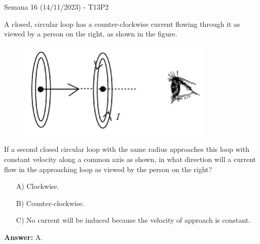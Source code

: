 \begin{frame}{Semana 16 (14/11/2023) - T13P2}
    
    A closed, circular loop has a counter-clockwise current flowing through it as viewed by a person on the right, as shown in the figure.
    
    \begin{figure}
        \centering
        \includegraphics[scale=0.4]{figures/t11p2.png}
    \end{figure}
    
    If a second closed circular loop with the same radius approaches this loop with constant velocity along a common axis as shown, in what direction will a current flow in the approaching loop as viewed by the person on the right?
    
    \begin{itemize}
        \item[A)] Clockwise.
        \item[B)] Counter-clockwise.
        \item[C)] No current will be induced because the velocity of approach is constant.
    \end{itemize}
    
    \pause \centering \textbf{Answer:} A.
    
\end{frame}

